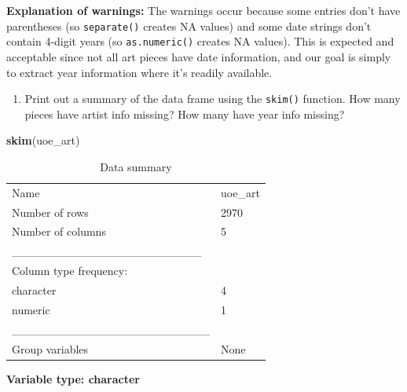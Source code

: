 \documentclass[
]{article}
\newenvironment{Shaded}{\begin{snugshade}}{\end{snugshade}}
\newcommand{\FunctionTok}[1]{\textcolor[rgb]{0.13,0.29,0.53}{\textbf{#1}}}
\newcommand{\NormalTok}[1]{#1}
\providecommand{\tightlist}{%
  \setlength{\itemsep}{0pt}\setlength{\parskip}{0pt}}
\begin{document}
\textbf{Explanation of warnings:} The warnings occur because some
entries don't have parentheses (so \texttt{separate()} creates NA
values) and some date strings don't contain 4-digit years (so
\texttt{as.numeric()} creates NA values). This is expected and
acceptable since not all art pieces have date information, and our goal
is simply to extract year information where it's readily available.

\begin{enumerate}
\def\labelenumi{\arabic{enumi}.}
\setcounter{enumi}{9}
\tightlist
\item
  Print out a summary of the data frame using the \texttt{skim()}
  function. How many pieces have artist info missing? How many have year
  info missing?
\end{enumerate}

\begin{Shaded}
\begin{Highlighting}[]
\FunctionTok{skim}\NormalTok{(uoe\_art)}
\end{Highlighting}
\end{Shaded}

\begin{longtable}[]{@{}ll@{}}
\caption{Data summary}\tabularnewline
\toprule\noalign{}
\endfirsthead
\endhead
\bottomrule\noalign{}
\endlastfoot
Name & uoe\_art \\
Number of rows & 2970 \\
Number of columns & 5 \\
\_\_\_\_\_\_\_\_\_\_\_\_\_\_\_\_\_\_\_\_\_\_\_ & \\
Column type frequency: & \\
character & 4 \\
numeric & 1 \\
\_\_\_\_\_\_\_\_\_\_\_\_\_\_\_\_\_\_\_\_\_\_\_\_ & \\
Group variables & None \\
\end{longtable}

\textbf{Variable type: character}
\end{document}
